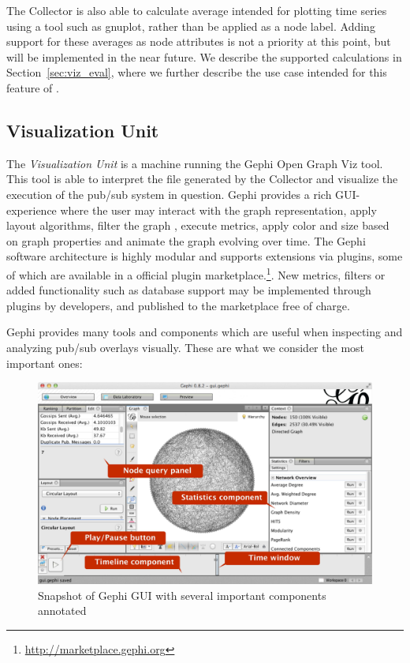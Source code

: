 The Collector is also able to calculate average intended for
plotting time series using a tool such as gnuplot, rather than be
applied as a node label. Adding support for
these averages as node attributes is not a priority at this point, but
will be implemented in the near future. We describe the supported
calculations in
Section~\ref{sec:viz_eval}, where we further describe the use case
intended for this feature of \demo.

\subsection{Visualization Unit}

The \emph{Visualization Unit} is a machine running the Gephi Open Graph
Viz tool. This tool is able to interpret the \gexf{} file generated by
the Collector and visualize the execution of the pub/sub system in
question.  Gephi provides a rich GUI-experience where the user may
interact with the graph representation, apply layout algorithms, filter
the graph , execute metrics, apply color and size based on graph
properties and animate the graph evolving over time.  The Gephi software
architecture is highly modular and supports extensions via plugins, some
of which are available in a official plugin
marketplace.\footnote{\url{http://marketplace.gephi.org}}. New metrics,
filters or added functionality such as database support may be
implemented through plugins by developers, and published to the
marketplace free of charge.

Gephi provides many tools and components which are useful when
inspecting and analyzing pub/sub overlays visually. These are what we
consider the most important ones:

\begin{figure}[h]
    \centering
    \includegraphics[width=\textwidth]{figures/gui_ann}
    \caption{Snapshot of Gephi GUI with several important components
        annotated}
\end{figure}

